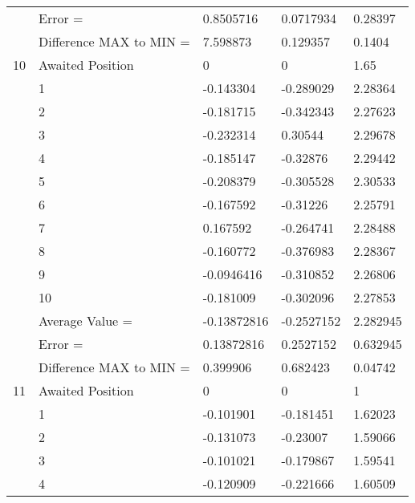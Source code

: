 \begin{tabular}{|p{2cm}|p{3cm}|p{3cm}|p{3cm}|p{3cm}|}
             & Error =                 & 0.8505716    & 0.0717934    & 0.28397    \\
             & Difference MAX to MIN = & 7.598873     & 0.129357     & 0.1404     \\
\hline
10           & Awaited Position        & 0            & 0            & 1.65       \\
             & 1                       & -0.143304    & -0.289029    & 2.28364    \\
             & 2                       & -0.181715    & -0.342343    & 2.27623    \\
             & 3                       & -0.232314    & 0.30544      & 2.29678    \\
             & 4                       & -0.185147    & -0.32876     & 2.29442    \\
             & 5                       & -0.208379    & -0.305528    & 2.30533    \\
             & 6                       & -0.167592    & -0.31226     & 2.25791    \\
             & 7                       & 0.167592     & -0.264741    & 2.28488    \\
             & 8                       & -0.160772    & -0.376983    & 2.28367    \\
             & 9                       & -0.0946416   & -0.310852    & 2.26806    \\
             & 10                      & -0.181009    & -0.302096    & 2.27853    \\
             & Average Value =         & -0.13872816  & -0.2527152   & 2.282945   \\
             & Error =                 & 0.13872816   & 0.2527152    & 0.632945   \\
             & Difference MAX to MIN = & 0.399906     & 0.682423     & 0.04742    \\
\hline
11           & Awaited Position        & 0            & 0            & 1          \\
             & 1                       & -0.101901    & -0.181451    & 1.62023    \\
             & 2                       & -0.131073    & -0.23007     & 1.59066    \\
             & 3                       & -0.101021    & -0.179867    & 1.59541    \\
             & 4                       & -0.120909    & -0.221666    & 1.60509    \\

\end{tabular}
